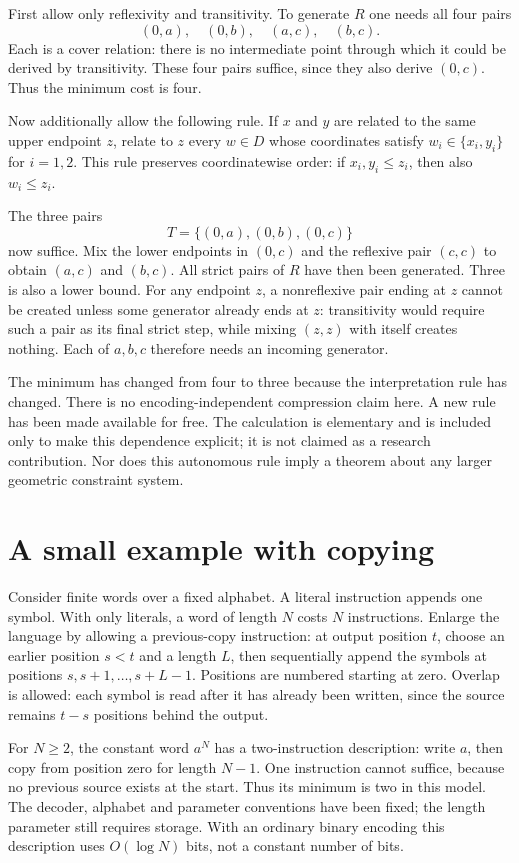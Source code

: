 \documentclass[11pt]{article}
\begin{document}
First allow only reflexivity and transitivity. To generate $R$ one needs all four
pairs
\[
(0,a),\quad (0,b),\quad (a,c),\quad (b,c).
\]
Each is a cover relation: there is no intermediate point through which it could
be derived by transitivity. These four pairs suffice, since they also derive
$(0,c)$. Thus the minimum cost is four.

Now additionally allow the following rule. If $x$ and $y$ are related to the same
upper endpoint $z$, relate to $z$ every $w\in D$ whose coordinates satisfy
$w_i\in\{x_i,y_i\}$ for $i=1,2$. This rule preserves coordinatewise order: if
$x_i,y_i\le z_i$, then also $w_i\le z_i$.

The three pairs
\[
T=\{(0,a),(0,b),(0,c)\}
\]
now suffice. Mix the lower endpoints in $(0,c)$ and the reflexive pair $(c,c)$ to
obtain $(a,c)$ and $(b,c)$. All strict pairs of $R$ have then been generated.
Three is also a lower bound. For any endpoint $z$, a nonreflexive pair ending at
$z$ cannot be created unless some generator already ends at $z$: transitivity
would require such a pair as its final strict step, while mixing $(z,z)$ with
itself creates nothing. Each of $a,b,c$ therefore needs an incoming generator.

The minimum has changed from four to three because the interpretation rule has
changed. There is no encoding-independent compression claim here. A new rule has
been made available for free. The calculation is elementary and is included only
to make this dependence explicit; it is not claimed as a research contribution.
Nor does this autonomous rule imply a theorem about any larger geometric
constraint system.

\section{A small example with copying}
Consider finite words over a fixed alphabet. A literal instruction appends one
symbol. With only literals, a word of length $N$ costs $N$ instructions. Enlarge the language by allowing a
previous-copy instruction: at output position $t$, choose an earlier position
$s<t$ and a length $L$, then sequentially append the symbols at positions
$s,s+1,\ldots,s+L-1$. Positions are numbered starting at zero. Overlap is allowed:
each symbol is read after it has already been written, since the source remains
$t-s$ positions behind the output.

For $N\ge2$, the constant word $a^N$ has a two-instruction description: write $a$,
then copy from position zero for length $N-1$. One instruction cannot suffice,
because no previous source exists at the start. Thus its minimum is two in this
model. The decoder, alphabet and parameter conventions have been fixed; the
length parameter still requires storage. With an ordinary binary encoding this
description uses $O(\log N)$ bits, not a constant number of bits.
\end{document}
